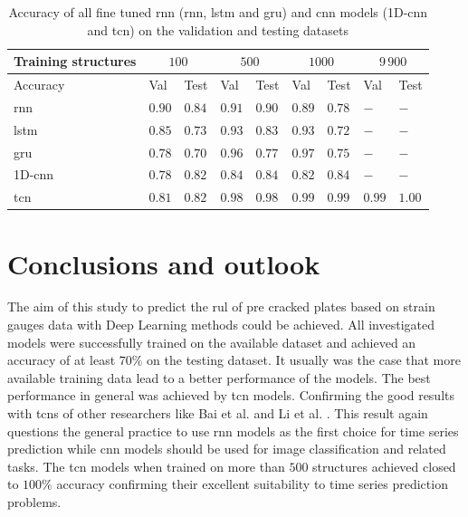 \documentclass[conference]{IEEEtran}
\begin{document}
\begin{table}[htp]
	\centering
	\caption{Accuracy of all fine tuned \gls{rnn} (\gls{rnn}, \gls{lstm} and \gls{gru}) and \gls{cnn} models (1D-\gls{cnn} and \gls{tcn}) on the validation and testing datasets}
	\label{tab:accuracy_testing_rnn_cnn}
	\setlength{\tabcolsep}{2.8pt} %
	\begin{tabular}{l|ll|ll|ll|ll}
		Training structures & \multicolumn{2}{c|}{$ 100 $} & \multicolumn{2}{c|}{$ 500 $} & \multicolumn{2}{c|}{$ 1000 $} & \multicolumn{2}{c}{$ 9\,900 $} \\
		\hline
		Accuracy & Val & Test & Val & Test & Val & Test & Val & Test \\
		\hline
		\gls{rnn} & $ \boldsymbol{0.90} $ & $ \boldsymbol{0.84} $ & $ 0.91 $ & $ 0.90 $ & $ 0.89 $ & $ 0.78 $ & $ - $ & $ - $ \\
		\gls{lstm} & $ 0.85 $ & $ 0.73 $ & $ 0.93 $ & $ 0.83 $ & $ 0.93 $ & $ 0.72 $ & $ - $ & $ - $ \\
		\gls{gru} & $ 0.78 $ & $ 0.70 $ & $ 0.96 $ & $ 0.77 $ & $ 0.97 $ & $ 0.75 $ & $ - $ & $ - $ \\
		\hline
		1D-\gls{cnn} & $ 0.78 $ & $ 0.82 $ & $ 0.84 $ & $ 0.84 $ & $ 0.82 $ & $ 0.84 $ & $ - $ & $ - $ \\
		\gls{tcn} & $ 0.81 $ & $ 0.82 $ & $ \boldsymbol{0.98} $ & $ \boldsymbol{0.98} $ & $ \boldsymbol{0.99} $ & $ \boldsymbol{0.99} $ & $ \boldsymbol{0.99} $ & $ \boldsymbol{1.00} $ \\
	\end{tabular}

\end{table}

\section{Conclusions and outlook}
\label{sec:conclusions_outlook}

The aim of this study to predict the \gls{rul} of pre cracked plates based on strain gauges data with Deep Learning methods could be achieved. All investigated models were successfully trained on the available dataset and achieved an accuracy of at least $ 70 \% $ on the testing dataset. It usually was the case that more available training data lead to a better performance of the models. The best performance in general was achieved by \gls{tcn} models. Confirming the good results with \glspl{tcn} of other researchers like Bai et al. \cite{Bai2018} and Li et al. \cite{Li2018}. This result again questions the general practice to use \gls{rnn} models as the first choice for time series prediction while \gls{cnn} models should be used for image classification and related tasks. The \gls{tcn} models when trained on more than $ 500 $ structures achieved closed to $ 100 \% $ accuracy confirming their excellent suitability to time series prediction problems.
\end{document}
